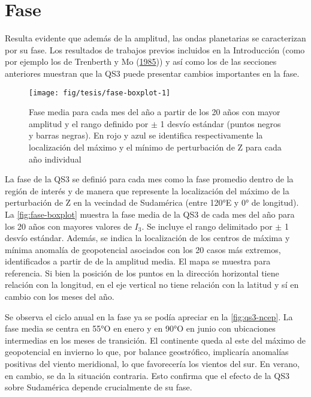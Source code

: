 \documentclass[spanish,a4paper,12p]{book}
\begin{document}
\section{Fase}\label{fase}

Resulta evidente que además de la amplitud, las ondas planetarias se
caracterizan por su fase. Los resultados de trabajos previos incluidos
en la Introducción (como por ejemplo los de Trenberth y Mo
(\protect\hyperlink{ref-Trenberth1985}{1985})) y así como los de las
secciones anteriores muestran que la QS3 puede presentar cambios
importantes en la fase.

\begin{landscape}\begin{figure}

{\centering \texttt{[image: fig/tesis/fase-boxplot-1]} 

}

\caption{Fase media para cada mes del año a partir de los 20 años con mayor amplitud y el rango definido por $\pm$ 1 desvío estándar  (puntos negros y barras negras). En rojo y azul se identifica respectivamente la localización del máximo y el mínimo de perturbación de Z para cada año individual}\label{fig:fase-boxplot}
\end{figure}
\end{landscape}

La fase de la QS3 se definió para cada mes como la fase promedio dentro
de la región de interés y de manera que represente la localización del
máximo de la perturbación de Z en la vecindad de Sudamérica (entre 120°E
y 0° de longitud). La \autoref{fig:fase-boxplot} muestra la fase media
de la QS3 de cada mes del año para los 20 años con mayores valores de
\(I_3\). Se incluye el rango delimitado por \(\pm\) 1 desvío estándar.
Además, se indica la localización de los centros de máxima y mínima
anomalía de geopotencial asociados con los 20 casos más extremos,
identificados a partir de de la amplitud media. El mapa se muestra para
referencia. Si bien la posición de los puntos en la dirección horizontal
tiene relación con la longitud, en el eje vertical no tiene relación con
la latitud y sí en cambio con los meses del año.

Se observa el ciclo anual en la fase ya se podía apreciar en la
\autoref{fig:qs3-ncep}. La fase media se centra en 55°O en enero y en
90°O en junio con ubicaciones intermedias en los meses de transición. El
continente queda al este del máximo de geopotencial en invierno lo que,
por balance geostrófico, implicaría anomalías positivas del viento
meridional, lo que favorecería los vientos del sur. En verano, en
cambio, se da la situación contraria. Esto confirma que el efecto de la
QS3 sobre Sudamérica depende crucialmente de su fase.
\end{document}
